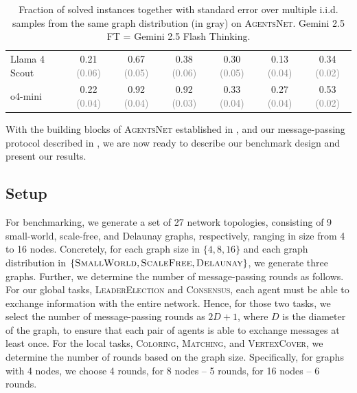 \documentclass{article}
\newcommand{\benchmark}{\textsc{AgentsNet}}
\begin{document}
\begin{table}
{\begin{tabular}{lccccc|c}
Llama 4 Scout & 0.21 \tiny \textcolor{gray}{(0.06)} & 0.67 \tiny \textcolor{gray}{(0.05)} & 0.38 \tiny \textcolor{gray}{(0.06)} & 0.30 \tiny \textcolor{gray}{(0.05)} & 0.13 \tiny \textcolor{gray}{(0.04)} & 0.34 \tiny \textcolor{gray}{(0.02)} \\
o4-mini & 0.22 \tiny \textcolor{gray}{(0.04)} & 0.92 \tiny \textcolor{gray}{(0.04)} & 0.92 \tiny \textcolor{gray}{(0.03)} & 0.33 \tiny \textcolor{gray}{(0.04)} & 0.27 \tiny \textcolor{gray}{(0.04)} & 0.53 \tiny \textcolor{gray}{(0.02)} \\
       \bottomrule
    \end{tabular}}
    \caption{Fraction of solved instances together with standard error over multiple i.i.d. samples from the same graph distribution (in gray) on \benchmark{}. Gemini 2.5 FT = Gemini 2.5 Flash Thinking.}
    \label{tab:main_results}
\end{table}



With the building blocks of \benchmark{} established in , and our message-passing protocol described in , we are now ready to describe our benchmark design and present our results.%

\subsection{Setup}
For benchmarking, we generate a set of 27 network topologies, consisting of 9 small-world, scale-free, and Delaunay graphs, respectively, ranging in size from 4 to 16 nodes. Concretely, for each graph size in $\{4, 8, 16\}$ and each graph distribution in $\{\textsc{SmallWorld}, \textsc{ScaleFree}, \textsc{Delaunay}\}$, we generate three graphs. Further, we determine the number of message-passing rounds as follows. For our global tasks, \textsc{LeaderElection} and \textsc{Consensus}, each agent must be able to exchange information with the entire network. Hence, for those two tasks, we select the number of message-passing rounds as $2D+1$, where $D$ is the diameter of the graph, to ensure that each pair of agents is able to exchange messages at least once. For the local tasks, \textsc{Coloring}, \textsc{Matching}, and \textsc{VertexCover}, we determine the number of rounds based on the graph size. Specifically, for graphs with 4 nodes, we choose 4 rounds, for 8 nodes -- 5 rounds, for  16 nodes -- 6 rounds.
\end{document}
